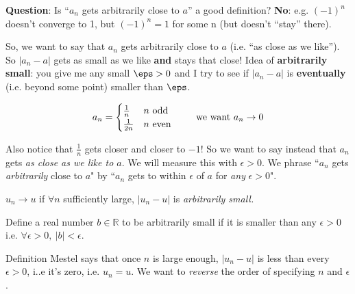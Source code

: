 \documentclass[10pt,twoside]{scrartcl}
\begin{document}
\textbf{Question}: Is ``$a_n$ gets arbitrarily close to $a$'' a good definition?
\textbf{No}: e.g. $(-1)^n$ doesn't converge to 1, but $(-1)^n = 1$ for some n (but doesn't ``stay'' there).

So, we want to say that $a_n$ gets arbitrarily close to $a$ (i.e. ``as close as we like''). So $|a_n - a|$ gets as small as we like \textbf{and} stays that close! Idea of \textbf{arbitrarily small}: you give me any small $\eps > 0$ and I try to see if $|a_n - a|$ is \textbf{eventually} (i.e. beyond some point) smaller than $\eps$.

\[a_n = 
\begin{cases}
\frac{1}{n} & n \text{ odd}\\
\frac{1}{2n} & n \text{ even}	
\end{cases}
\hspace*{20pt}\text{ we want } a_n \to 0\]


\begin{center}
\end{center}
Also notice that $\frac{1}{n}$ gets closer and closer to $-1$! So we want to say instead that $a_n$ gets \emph{as close as we like to $a$}. We will measure this with $\epsilon >0$. We phrase ``$a_n$ gets \emph{arbitrarily} close to $a$" by ``$a_n$ gets to within $\epsilon$ of $a$ for \emph{any} $\epsilon >0$".\\

\begin{definition}[Mestel]
	$u_n \to u$ if $\forall n$ sufficiently large, $|u_n - u|$ is \emph{arbitrarily small.} 
	
Define a real number $b \in \mathbb{R}$ to be arbitrarily small if it is smaller than any $\epsilon >0$ i.e. $\forall \epsilon >0,~|b| < \epsilon$.
\end{definition}

Definition Mestel says that once $n$ is large enough, $|u_n - u|$ is less than every $\epsilon >0$, i..e it's zero, i.e. $u_n = u$. We want to \emph{reverse} the order of specifying $n$ and $\epsilon$. 
\end{document}
